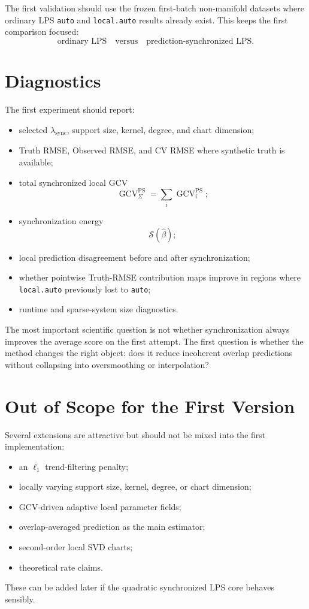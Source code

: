 \documentclass[11pt]{article}
\begin{document}
The first validation should use the frozen first-batch non-manifold datasets
where ordinary LPS \texttt{auto} and \texttt{local.auto} results already exist.
This keeps the first comparison focused:
\[
  \text{ordinary LPS}
  \quad\text{versus}\quad
  \text{prediction-synchronized LPS}.
\]

\section{Diagnostics}

The first experiment should report:
\begin{itemize}[leftmargin=*]
  \item selected \(\lambda_{\mathrm{sync}}\), support size, kernel, degree, and
    chart dimension;
  \item Truth RMSE, Observed RMSE, and CV RMSE where synthetic truth is
    available;
  \item total synchronized local GCV
    \[
      \operatorname{GCV}^{\mathrm{PS}}_{\Sigma}
      =
      \sum_i \operatorname{GCV}^{\mathrm{PS}}_i;
    \]
  \item synchronization energy
    \[
      \mathcal S(\widehat\beta);
    \]
  \item local prediction disagreement before and after synchronization;
  \item whether pointwise Truth-RMSE contribution maps improve in regions where
    \texttt{local.auto} previously lost to \texttt{auto};
  \item runtime and sparse-system size diagnostics.
\end{itemize}

The most important scientific question is not whether synchronization always
improves the average score on the first attempt.  The first question is whether
the method changes the right object: does it reduce incoherent overlap
predictions without collapsing into oversmoothing or interpolation?

\section{Out of Scope for the First Version}

Several extensions are attractive but should not be mixed into the first
implementation:
\begin{itemize}[leftmargin=*]
  \item an \(\ell_1\) trend-filtering penalty;
  \item locally varying support size, kernel, degree, or chart dimension;
  \item GCV-driven adaptive local parameter fields;
  \item overlap-averaged prediction as the main estimator;
  \item second-order local SVD charts;
  \item theoretical rate claims.
\end{itemize}
These can be added later if the quadratic synchronized LPS core behaves
sensibly.
\end{document}
